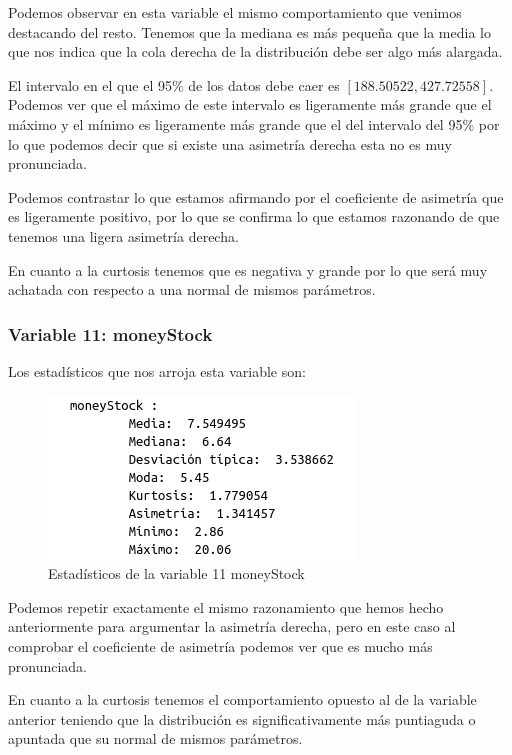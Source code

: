 \documentclass[12pt,a4paper]{article}
\begin{document}
Podemos observar en esta variable el mismo comportamiento que venimos destacando del resto. Tenemos que la mediana es más pequeña que la media lo que nos indica que la cola derecha de la distribución debe ser algo más alargada.

El intervalo en el que el 95\% de los datos debe caer es $[188.50522, 427.72558]$. Podemos ver que el máximo de este intervalo es ligeramente más grande que el máximo y el mínimo es ligeramente más grande que el del intervalo del 95\% por lo que podemos decir que si existe una asimetría derecha esta no es muy pronunciada.

Podemos contrastar lo que estamos afirmando por el coeficiente de asimetría que es ligeramente positivo, por lo que se confirma lo que estamos razonando de que tenemos una ligera asimetría derecha.

En cuanto a la curtosis tenemos que es negativa y grande por lo que será muy achatada con respecto a una normal de mismos parámetros.

\subsubsection*{Variable 11: moneyStock}

Los estadísticos que nos arroja esta variable son:

\begin{figure}[H]
	\centering
	\includegraphics[scale=0.7]{./Imagenes/EDA/Regresion/estadisticos_moneyStock.png}
	\caption{Estadísticos de la variable 11 moneyStock}
\end{figure}

Podemos repetir exactamente el mismo razonamiento que hemos hecho anteriormente para argumentar la asimetría derecha, pero en este caso al comprobar el coeficiente de asimetría podemos ver que es mucho más pronunciada.

En cuanto a la curtosis tenemos el comportamiento opuesto al de la variable anterior teniendo que la distribución es significativamente más puntiaguda o apuntada que su normal de mismos parámetros.
\end{document}
